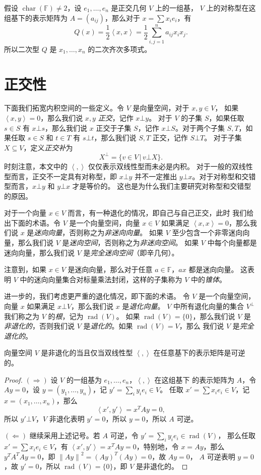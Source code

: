 \documentclass[fontset=none,zihao=-4]{Notes}
\DeclareMathOperator\cha{char}
\DeclareMathOperator\rad{rad}
\newcommand{\inn}[1]{\left\langle#1\right\rangle}
\newcommand{\norm}[1]{\left\lVert#1\right\rVert}
\begin{document}
假设 $\cha(\mathbb{F})\neq 2$，设 $e_1,\dots,e_n$ 是正交几何 $V$ 上的一组基，
$V$ 上的对称型在这组基下的表示矩阵为 $A=(a_{ij})$，那么对于
$x=\sum x_ie_i$，有
\[
  Q(x)=\frac{1}{2}\inn{x,x}=\frac{1}{2}\sum_{i,j=1}^n a_{ij}x_ix_j.  
\]
所以二次型 $Q$ 是 $x_1,\dots,x_n$ 的二次齐次多项式。

\section{正交性}

下面我们拓宽内积空间的一些定义。令 $V$ 是向量空间，对于 $x,y\in V$，
如果 $\inn{x,y}=0$，那么我们说 $x,y$ \emph{正交}，记作 $x\bot y$。
对于 $V$ 的子集 $S$，如果任取 $s\in S$ 有 $x\bot s$，那么我们说
$x$ 正交于子集 $S$，记作 $x\bot S$。对于两个子集 $S,T$，如果任取 $s\in S$
和 $t\in T$ 有 $s\bot t$，那么我们说 $S,T$ 正交，记作 $S\bot T$。
对于子集 $X\subseteq V$，定义\emph{正交补}为
\[
  X^\bot =\{v\in V\,|\, v\bot X\}.  
\]
时刻注意，本文中的 $\inn{,}$ 仅仅表示双线性型而未必是内积。
对于一般的双线性型而言，正交不一定具有对称型，即 $x\bot y$ 并不一定推出
$y\bot x$。对于对称型和交错型而言，$x\bot y$ 和 $y\bot x$ 才是等价的。
这也是为什么我们主要研究对称型和交错型的原因。

对于一个向量 $x\in V$ 而言，有一种退化的情况，即自己与自己正交，此时
我们给出下面的术语。令 $V$ 是一个向量空间，向量 $x\in V$ 如果满足
$\inn{x,x}=0$，那么我们说 $x$ 是\emph{迷向向量}，否则称之为\emph{非迷向向量}。
如果 $V$ 至少包含一个非零迷向向量，那么我们说 $V$ 是\emph{迷向空间}，否则称之为\emph{非迷向空间}。
如果 $V$ 中每个向量都是迷向向量，那么我们说 $V$ 是\emph{完全迷向空间}（即辛几何）。

注意到，如果 $x\in V$ 是迷向向量，那么对于任意 $a\in\mathbb{F}$，$ax$ 都是迷向向量。
这表明 $V$ 中的迷向向量集合对标量乘法封闭，这样的子集称为 $V$ 中的\emph{锥体}。

进一步的，我们考虑更严重的退化情况，即下面的术语。
令 $V$ 是一个向量空间，向量 $x$ 如果满足 $x\bot V$，那么我们说 $x$ 是\emph{退化向量}。
$V$ 中所有退化向量的集合 $V^\bot$ 我们称之为 $V$ 的\emph{根}，记为 $\rad(V)$。
如果 $\rad(V)=\{0\}$，那么我们说 $V$ 是\emph{非退化的}，否则我们说
$V$ 是\emph{退化的}。如果 $\rad(V)=V$，那么
我们说 $V$ 是\emph{完全退化的}。

\begin{theorem}
  向量空间 $V$ 是非退化的当且仅当双线性型 $\inn{,}$ 在任意基下的表示矩阵是可逆的。
\end{theorem}
\begin{proof}
  $(\Rightarrow)$ 设 $V$ 的一组基为 $e_1,\dots,e_n$，$\inn{,}$ 在这组基下
  的表示矩阵为 $A$，令 $Ay=0$，设 $y=(y_1,\dots,y_n)$，记 $y'=\sum_i y_ie_i\in V$。
  任取 $x'=\sum x_ie_i\in V$，记 $x=(x_1,\dots,x_n)$，那么 
  \[
    \inn{x',y'}=x^TAy=0,  
  \]
  所以 $y'\bot V$，$V$ 非退化表明 $y'=0$，所以 $y=0$，所以 $A$ 可逆。

  $(\Leftarrow)$ 继续采用上述记号。若 $A$ 可逆，令 $y'=\sum_iy_ie_i\in\rad(V)$，
  那么任取 $x'=\sum x_ie_i\in V$，有 $\inn{x',y'}=x^TAy=0$，特别地，令
  $x=Ay$，那么 $y^TA^TAy=0$，即 $\norm{Ay}^2=(Ay)^T(Ay)=0$，故 $Ay=0$，
  $A$ 可逆表明 $y=0$，故 $y'=0$，所以 $\rad(V)=\{0\}$，即 $V$ 是非退化的。
\end{proof}
\end{document}
